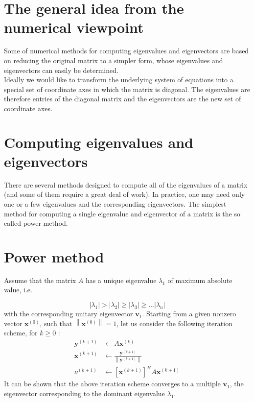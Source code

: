 \documentclass[11pt]{book}
\begin{document}
\section*{The general idea from the numerical viewpoint}

Some of numerical methods for computing eigenvalues and eigenvectors are based on reducing the original matrix to a simpler form, whose eigenvalues and eigenvectors can  easily be determined.\\
Ideally we would like to transform the underlying system of equations into a special set of coordinate axes in which the matrix is diagonal. The eigenvalues are therefore entries of the diagonal matrix and the eigenvectors are the new set of coordinate axes.

\section*{Computing eigenvalues and eigenvectors}
There are several methods designed to compute all of the eigenvalues of a matrix (and some of them require a great deal of work).
In practice, one may need only one or a few eigenvalues and the corresponding eigenvectors.
The simplest method for computing a single eigenvalue and eigenvector of a matrix is the so called power method.

\section*{Power method}
Assume that the matrix $A$ has a unique eigenvalue $\lambda_{1}$ of maximum absolute value, i.e.

$$
\left|\lambda_{1}\right|>\left|\lambda_{2}\right| \geq\left|\lambda_{3}\right| \geq \ldots\left|\lambda_{n}\right|
$$
with the corresponding unitary eigenvector $\mathbf{v}_{1}$.
Starting from a given nonzero vector $\mathbf{x}^{(0)}$, such that $\left\|\mathbf{x}^{(0)}\right\|=1$, let us consider the following iteration scheme, for $k \geq 0$ :
$$
\begin{aligned}
\mathbf{y}^{(k+1)} & \leftarrow A \mathbf{x}^{(k)} \\
\mathbf{x}^{(k+1)} & \leftarrow \frac{\mathbf{y}^{(k+1)}}{\left\|\mathbf{y}^{(k+1)}\right\|} \\
\nu^{(k+1)} & \leftarrow\left[\mathbf{x}^{(k+1)}\right]^{H} A \mathbf{x}^{(k+1)}
\end{aligned}
$$
It can be shown that the above iteration scheme converges to a multiple $\mathbf{v}_{1}$, the eigenvector corresponding to the dominant eigenvalue $\lambda_{1}$.
\end{document}
